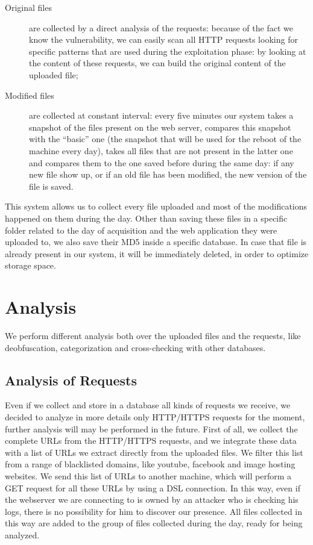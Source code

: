 \begin{description}
\item[Original files] are collected by a direct analysis of the requests: because of the fact we know the vulnerability, we can easily scan all HTTP requests looking for specific patterns that are used during the exploitation phase: by looking at the content of these requests, we can build the original content of the uploaded file;
\item[Modified files] are collected at constant interval: every five minutes our system takes a snapshot of the files present on the web server, compares this snapshot with the ``basic'' one (the snapshot that will be used for the reboot of the machine every day), takes all files that are not present in the latter one and compares them to the one saved before during the same day: if any new file show up, or if an old file has been modified, the new version of the file is saved.
\end{description}

This system allows us to collect every file uploaded and most of the modifications happened on them during the day.
Other than saving these files in a specific folder related to the day of acquisition and the web application they were uploaded to, we also save their MD5 inside a specific database. In case that file is already present in our system, it will be immediately deleted, in order to optimize storage space.

\section{Analysis}

We perform different analysis both over the uploaded files and the requests, like deobfuscation, categorization and cross-checking with other databases.

\subsection{Analysis of Requests}

Even if we collect and store in a database all kinds of requests we receive, we decided to analyze in more details only HTTP/HTTPS requests for the moment, further analysis will may be performed in the future.
First of all, we collect the complete URLs from the HTTP/HTTPS requests, and we integrate these data with a list of URLs we extract directly from the uploaded files. We filter this list from a range of blacklisted domains, like youtube, facebook and image hosting websites. We send this list of URLs to another machine, which will perform a GET request for all these URLs by using a DSL connection. In this way, even if the webserver we are connecting to is owned by an attacker who is checking his logs, there is no possibility for him to discover our presence. All files collected in this way are added to the group of files collected during the day, ready for being analyzed.

